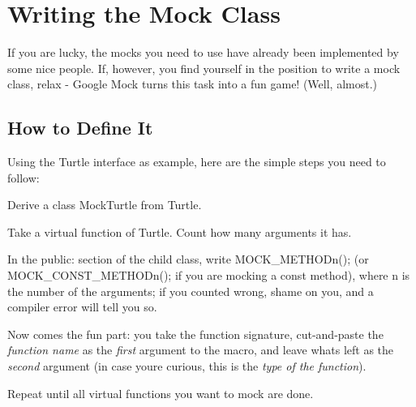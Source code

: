 \section*{Writing the Mock Class}

If you are lucky, the mocks you need to use have already been implemented by some nice people. If, however, you find yourself in the position to write a mock class, relax -\/ Google Mock turns this task into a fun game! (Well, almost.)

\subsection*{How to Define It}

Using the {\ttfamily Turtle} interface as example, here are the simple steps you need to follow\+:


\begin{DoxyEnumerate}
\item Derive a class {\ttfamily Mock\+Turtle} from {\ttfamily Turtle}.
\end{DoxyEnumerate}
\begin{DoxyEnumerate}
\item Take a virtual function of {\ttfamily Turtle}. Count how many arguments it has.
\end{DoxyEnumerate}
\begin{DoxyEnumerate}
\item In the {\ttfamily public\+:} section of the child class, write {\ttfamily M\+O\+C\+K\+\_\+\+M\+E\+T\+H\+O\+Dn();} (or {\ttfamily M\+O\+C\+K\+\_\+\+C\+O\+N\+S\+T\+\_\+\+M\+E\+T\+H\+O\+Dn();} if you are mocking a {\ttfamily const} method), where {\ttfamily n} is the number of the arguments; if you counted wrong, shame on you, and a compiler error will tell you so.
\end{DoxyEnumerate}
\begin{DoxyEnumerate}
\item Now comes the fun part\+: you take the function signature, cut-\/and-\/paste the {\itshape function name} as the {\itshape first} argument to the macro, and leave what\textquotesingle{}s left as the {\itshape second} argument (in case you\textquotesingle{}re curious, this is the {\itshape type of the function}).
\end{DoxyEnumerate}
\begin{DoxyEnumerate}
\item Repeat until all virtual functions you want to mock are done.
\end{DoxyEnumerate}


